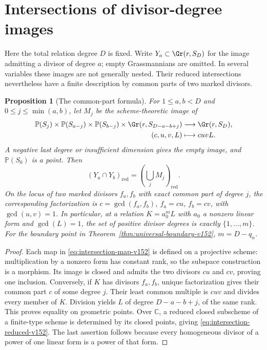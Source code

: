 \documentclass[11pt,reqno]{amsart}
\numberwithin{equation}{section}
\newtheorem{proposition}[theorem]{Proposition}
\theoremstyle{definition}\newtheorem{definition}[theorem]{Definition}
\theoremstyle{remark}\newtheorem{remark}[theorem]{Remark}
\newcommand{\C}{\mathbb C}\newcommand{\Q}{\mathbb Q}
\newcommand{\Pj}{\mathbb P}\newcommand{\A}{\mathbb A}
\begin{document}

\section{Intersections of divisor-degree images}
\label{sec:degree-intersections-v152}

Here the total relation degree $D$ is fixed.  Write $Y_a\subset
\Gr(r,S_D)$ for the image admitting a divisor of degree $a$;
empty Grassmannians are omitted.  In several variables these images
are not generally nested.  Their reduced intersections nevertheless
have a finite description by common parts of two marked divisors.

\begin{proposition}[The common-part formula]
\label{prop:degree-intersections-v152}
For $1\leq a,b<D$ and $0\leq j\leq\min(a,b)$, let $M_j$ be the
scheme-theoretic image of
\begin{equation}\label{eq:intersection-map-v152}
\begin{split}
 \Pj(S_j)\times\Pj(S_{a-j})\times\Pj(S_{b-j})
       \times\Gr(r,S_{D-a-b+j})&\longrightarrow\Gr(r,S_D),\\
                   (c,u,v,L)&\longmapsto cuvL.
\end{split}
\end{equation}
A negative last degree or insufficient dimension gives the empty
image, and $\Pj(S_0)$ is a point.  Then
\begin{equation}\label{eq:intersection-reduced-v152}
             (Y_a\cap Y_b)_{\mathrm{red}}
                         =\left(\bigcup_j M_j\right)_{\mathrm{red}}.
\end{equation}
On the locus of two marked divisors $f_a,f_b$ with exact common
part of degree $j$, the corresponding factorization is
$c=\gcd(f_a,f_b)$, $f_a=cu$, $f_b=cv$, with $\gcd(u,v)=1$.
In particular, at a relation $K=a_0^mL$ with $a_0$ a nonzero
linear form and $\gcd(L)=1$, the
set of positive divisor degrees is exactly $\{1,\ldots,m\}$.
For the boundary point in Theorem~\ref{thm:universal-boundary-v152},
$m=D-q_n$.
\end{proposition}
\begin{proof}
Each map in \eqref{eq:intersection-map-v152} is defined on a
projective scheme: multiplication by a nonzero form has constant
rank, so the subspace construction is a morphism.  Its image is
closed and admits the two divisors $cu$ and $cv$, proving one
inclusion.  Conversely, if $K$ has divisors $f_a,f_b$, unique
factorization gives their common part $c$ of some degree $j$.
Their least common multiple is $cuv$ and divides every member of
$K$.  Division yields $L$ of degree $D-a-b+j$, of the same rank.
This proves equality on geometric points.  Over $\C$, a reduced
closed subscheme of a finite-type scheme is determined by its closed
points, giving \eqref{eq:intersection-reduced-v152}.  The last
assertion follows because every homogeneous divisor of a power
of one linear form is a power of that form.
\end{proof}
\end{document}
